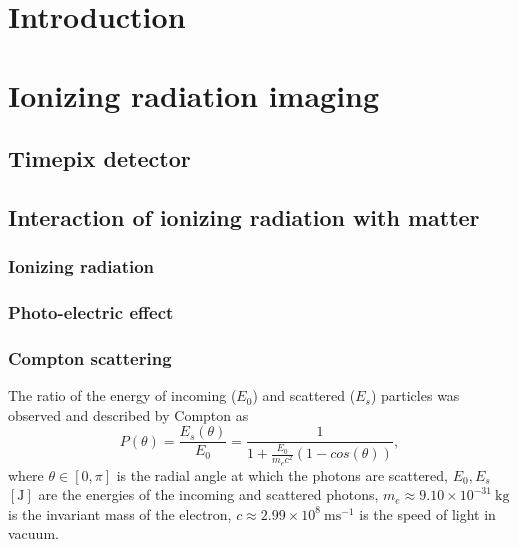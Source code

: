 \documentclass[a4paper,12pt,titlepage, twoside]{article}
\newcommand{\unit}[2]{$#1~\ensuremath{\mathrm{#2}}$}
\begin{document}


\section{Introduction}



\section{Ionizing radiation imaging}


\subsection{Timepix detector}



\subsection{Interaction of ionizing radiation with matter}

\subsubsection{Ionizing radiation}

\subsubsection{Photo-electric effect}



\subsubsection{Compton scattering}

The ratio of the energy of incoming ($E_{0}$) and scattered ($E_{s}$) particles was observed and described by Compton as
\begin{equation}
  P\left(\theta\right) = \frac{E_{s}\left(\theta\right)}{E_{0}} = \frac{1}{1 + \frac{E_0}{m_ec^2}\left(1 - cos\left(\theta\right)\right)},
\end{equation}
where $\theta \in \left[0, \pi\right]$ is the radial angle at which the photons are scattered, $E_0, E_s$ $\left[\mathrm{J}\right]$ are the energies of the incoming and scattered photons, \unit{m_e \approx 9.10 \times 10^{-31}}{kg} is the invariant mass of the electron, \unit{c \approx 2.99 \times 10^{8}}{ms^{-1}} is the speed of light in vacuum.
\end{document}
